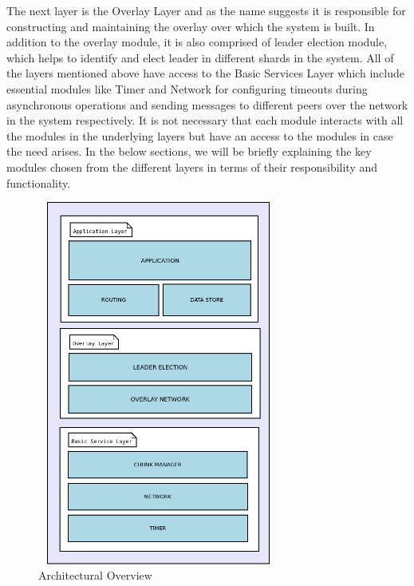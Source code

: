 \documentclass[12pt,a4paper,twoside,openright]{book}
\begin{document}
\par The next layer is the Overlay Layer and as the name suggests it is responsible for constructing and maintaining the overlay over which the system is built. In addition to the overlay module, it is also comprised of leader election module, which helps to identify and elect leader in different shards in the system. All of the layers mentioned above have access to the Basic Services Layer which include essential modules like Timer and Network for configuring timeouts during asynchronous operations and sending messages to different peers over the network in the system respectively. It is not necessary that each module interacts with all the modules in the underlying layers but have an access to the modules in case the need arises. In the below sections, we will be briefly explaining the key modules chosen from the different layers in terms of their responsibility and functionality.


\begin{figure}[h]
	\includegraphics[width=8cm, height=12cm]{architecture_new}
	\centering
	\caption{Architectural Overview}
	\label{fig:architecture}
\end{figure}


\end{document}
